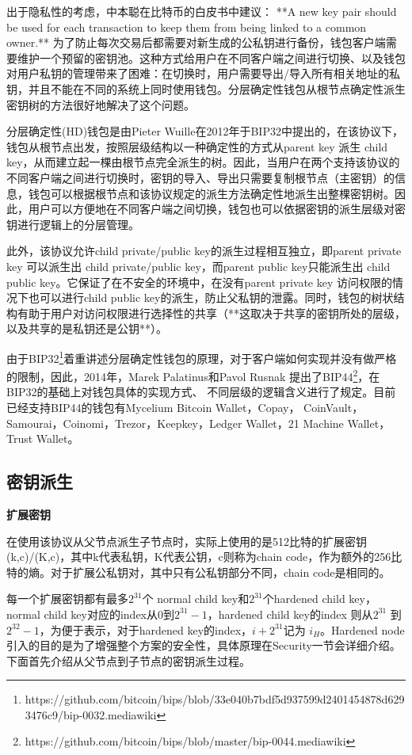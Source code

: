 \documentclass{article}
\begin{document}
出于隐私性的考虑，中本聪在比特币的白皮书中建议： **A new key pair should be used for each transaction to keep them
from being linked to a common owner.** 为了防止每次交易后都需要对新生成的公私钥进行备份，钱包客户端需要维护一个预留的密钥池。这种方式给用户在不同客户端之间进行切换、以及钱包对用户私钥的管理带来了困难：在切换时，用户需要导出/导入所有相关地址的私钥，并且不能在不同的系统上同时使用钱包。分层确定性钱包从根节点确定性派生密钥树的方法很好地解决了这个问题。

分层确定性(HD)钱包是由Pieter Wuille在2012年于BIP32中提出的，在该协议下，钱包从根节点出发，按照层级结构以一种确定性的方式从parent key 派生 child key，从而建立起一棵由根节点完全派生的树。因此，当用户在两个支持该协议的不同客户端之间进行切换时，密钥的导入、导出只需要复制根节点（主密钥）的信息，钱包可以根据根节点和该协议规定的派生方法确定性地派生出整棵密钥树。因此，用户可以方便地在不同客户端之间切换，钱包也可以依据密钥的派生层级对密钥进行逻辑上的分层管理。
  
此外，该协议允许child private/public key的派生过程相互独立，即parent private key 可以派生出 child private/public key，而parent public key只能派生出 child public key。它保证了在不安全的环境中，在没有parent private key 访问权限的情况下也可以进行child public key的派生，防止父私钥的泄露。同时，钱包的树状结构有助于用户对访问权限进行选择性的共享（**这取决于共享的密钥所处的层级，以及共享的是私钥还是公钥**）。  

由于BIP32\footnote{https://github.com/bitcoin/bips/blob/33e040b7bdf5d937599d2401454878d6293476c9/bip-0032.mediawiki}着重讲述分层确定性钱包的原理，对于客户端如何实现并没有做严格的限制，因此，2014年，Marek Palatinus和Pavol Rusnak 提出了BIP44\footnote{https://github.com/bitcoin/bips/blob/master/bip-0044.mediawiki}，在BIP32的基础上对钱包具体的实现方式、 不同层级的逻辑含义进行了规定。目前已经支持BIP44的钱包有Mycelium Bitcoin Wallet，Copay， CoinVault，Samourai，Coinomi，Trezor，Keepkey，Ledger Wallet，21 Machine Wallet， Trust Wallet。  

\subsection{密钥派生}

\textbf{扩展密钥}

 在使用该协议从父节点派生子节点时，实际上使用的是512比特的扩展密钥(k,c)/(K,c)，其中k代表私钥，K代表公钥，c则称为chain code，作为额外的256比特的熵。对于扩展公私钥对，其中只有公私钥部分不同，chain code是相同的。
 
 每一个扩展密钥都有最多$2^{31}$个 normal child key和$2^{31}$个hardened child key， normal child key对应的index从0到$2^{31}-1$，hardened child key的index 则从$2^{31}$ 到$2^{32}-1$，为便于表示，对于hardened key的index，$i+2^{31}$记为 $i_H$。Hardened node引入的目的是为了增强整个方案的安全性，具体原理在Security一节会详细介绍。下面首先介绍从父节点到子节点的密钥派生过程。
\end{document}
